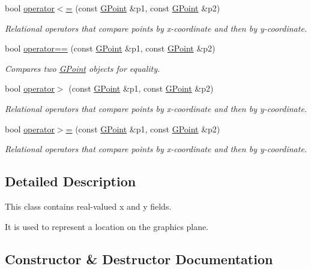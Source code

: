 \begin{DoxyCompactItemize}
bool \mbox{\hyperlink{classGPoint_a5b9606369659c394b2494828cb199b91}{operator$<$=}} (const \mbox{\hyperlink{classGPoint}{G\+Point}} \&p1, const \mbox{\hyperlink{classGPoint}{G\+Point}} \&p2)
\begin{DoxyCompactList}\small\item\em Relational operators that compare points by x-\/coordinate and then by y-\/coordinate. \end{DoxyCompactList}\item 
bool \mbox{\hyperlink{classGPoint_a128ff5199debc26d8f040bbd46f40a67}{operator==}} (const \mbox{\hyperlink{classGPoint}{G\+Point}} \&p1, const \mbox{\hyperlink{classGPoint}{G\+Point}} \&p2)
\begin{DoxyCompactList}\small\item\em Compares two \mbox{\hyperlink{classGPoint}{G\+Point}} objects for equality. \end{DoxyCompactList}\item 
bool \mbox{\hyperlink{classGPoint_a2ef77d4bff099bb0440be3bde3341bd1}{operator$>$}} (const \mbox{\hyperlink{classGPoint}{G\+Point}} \&p1, const \mbox{\hyperlink{classGPoint}{G\+Point}} \&p2)
\begin{DoxyCompactList}\small\item\em Relational operators that compare points by x-\/coordinate and then by y-\/coordinate. \end{DoxyCompactList}\item 
bool \mbox{\hyperlink{classGPoint_a0f6d51aeb0175e5c7ae32b43f732a742}{operator$>$=}} (const \mbox{\hyperlink{classGPoint}{G\+Point}} \&p1, const \mbox{\hyperlink{classGPoint}{G\+Point}} \&p2)
\begin{DoxyCompactList}\small\item\em Relational operators that compare points by x-\/coordinate and then by y-\/coordinate. \end{DoxyCompactList}\end{DoxyCompactItemize}


\subsection{Detailed Description}
This class contains real-\/valued x and y fields. 

It is used to represent a location on the graphics plane. 

\subsection{Constructor \& Destructor Documentation}
\mbox{\label{classGPoint_a8c6ed804b0b13bce303a77ff4fbb64b1}} 
